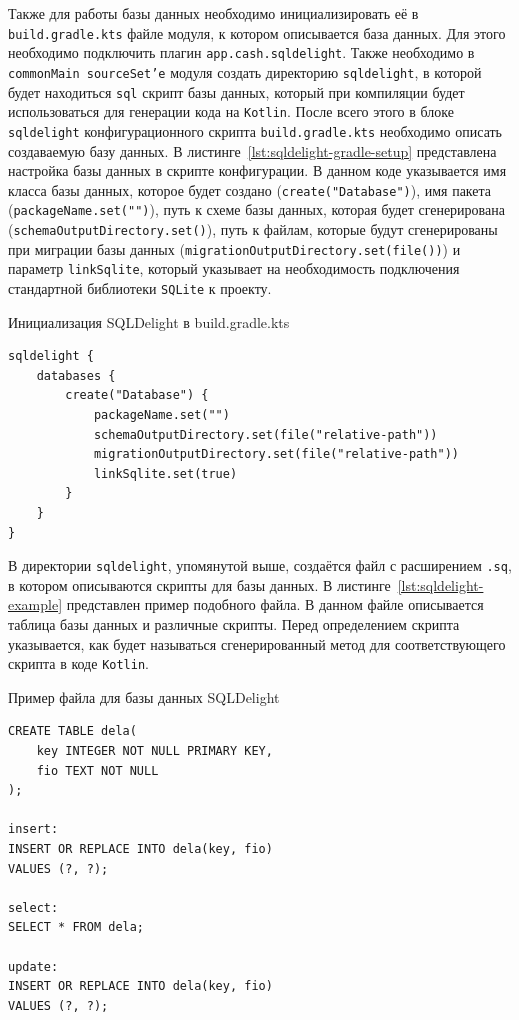 \documentclass[14pt, russian]{scrartcl}
\begin{document}
Также для работы базы данных необходимо инициализировать её в \texttt{build.gradle.kts} файле модуля, к котором описывается база данных. Для этого необходимо подключить плагин \texttt{app.cash.sqldelight}. Также необходимо в \texttt{commonMain sourceSet'e} модуля создать директорию \texttt{sqldelight}, в которой будет находиться \texttt{sql} скрипт базы данных, который при компиляции будет использоваться для генерации кода на \texttt{Kotlin}. После всего этого в блоке \texttt{sqldelight} конфигурационного скрипта \texttt{build.gradle.kts} необходимо описать создаваемую базу данных. В листинге~\ref{lst:sqldelight-gradle-setup} представлена настройка базы данных в скрипте конфигурации. В данном коде указывается имя класса базы данных, которое будет создано (\texttt{create("Database")}), имя пакета (\texttt{packageName.set("")}), путь к схеме базы данных, которая будет сгенерирована (\texttt{schemaOutputDirectory.set()}), путь к файлам, которые будут сгенерированы при миграции базы данных (\texttt{migrationOutputDirectory.set(file())}) и параметр \texttt{linkSqlite}, который указывает на необходимость подключения стандартной библиотеки \texttt{SQLite} к проекту.

\begin{listing}[!htb]
\caption{Инициализация SQLDelight в build.gradle.kts}
\label{lst:sqldelight-gradle-setup}
\begin{verbatim}
sqldelight {
    databases {
        create("Database") {
            packageName.set("")
            schemaOutputDirectory.set(file("relative-path"))
            migrationOutputDirectory.set(file("relative-path"))
            linkSqlite.set(true)
        }
    }
}
\end{verbatim}
\end{listing}

В директории \texttt{sqldelight}, упомянутой выше, создаётся файл с расширением \texttt{.sq}, в котором описываются скрипты для базы данных. В листинге~\ref{lst:sqldelight-example} представлен пример подобного файла. В данном файле описывается таблица базы данных и различные скрипты. Перед определением скрипта указывается, как будет называться сгенерированный метод для соответствующего скрипта в коде \texttt{Kotlin}.

\begin{listing}[!htb]
\caption{Пример файла для базы данных SQLDelight}
\label{lst:sqldelight-example}
\begin{verbatim}
CREATE TABLE dela(
    key INTEGER NOT NULL PRIMARY KEY,
    fio TEXT NOT NULL
);

insert:
INSERT OR REPLACE INTO dela(key, fio)
VALUES (?, ?);

select:
SELECT * FROM dela;

update:
INSERT OR REPLACE INTO dela(key, fio)
VALUES (?, ?);
\end{verbatim}
\end{listing}
\end{document}
